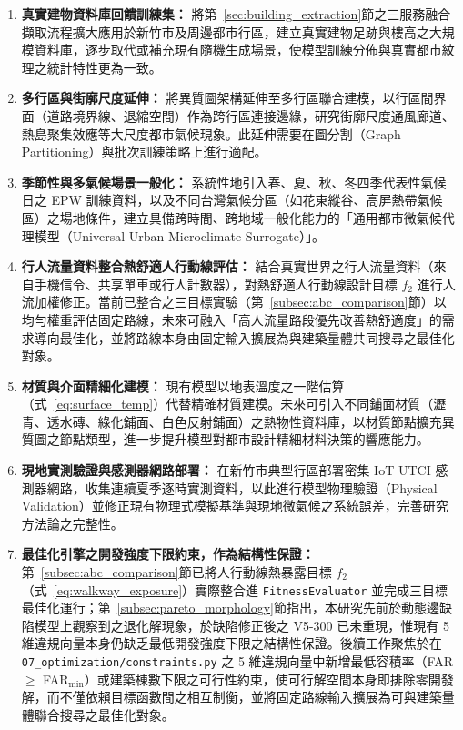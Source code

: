 \begin{enumerate}
    \item \textbf{真實建物資料庫回饋訓練集：}
    將第~\ref{sec:building_extraction}節之三服務融合擷取流程擴大應用於新竹市及周邊都市行區，建立真實建物足跡與樓高之大規模資料庫，逐步取代或補充現有隨機生成場景，使模型訓練分佈與真實都市紋理之統計特性更為一致。

    \item \textbf{多行區與街廓尺度延伸：}
    將異質圖架構延伸至多行區聯合建模，以行區間界面（道路境界線、退縮空間）作為跨行區連接邊緣，研究街廓尺度通風廊道、熱島聚集效應等大尺度都市氣候現象。此延伸需要在圖分割（Graph Partitioning）與批次訓練策略上進行適配。

    \item \textbf{季節性與多氣候場景一般化：}
    系統性地引入春、夏、秋、冬四季代表性氣候日之 EPW 訓練資料，以及不同台灣氣候分區（如花東縱谷、高屏熱帶氣候區）之場地條件，建立具備跨時間、跨地域一般化能力的「通用都市微氣候代理模型（Universal Urban Microclimate Surrogate）」。

    \item \textbf{行人流量資料整合熱舒適人行動線評估：}
    結合真實世界之行人流量資料（來自手機信令、共享單車或行人計數器），對熱舒適人行動線設計目標 $f_2$ 進行人流加權修正。當前已整合之三目標實驗（第~\ref{subsec:abc_comparison}節）以均勻權重評估固定路線，未來可融入「高人流量路段優先改善熱舒適度」的需求導向最佳化，並將路線本身由固定輸入擴展為與建築量體共同搜尋之最佳化對象。

    \item \textbf{材質與介面精細化建模：}
    現有模型以地表溫度之一階估算（式~\eqref{eq:surface_temp}）代替精確材質建模。未來可引入不同鋪面材質（瀝青、透水磚、綠化鋪面、白色反射鋪面）之熱物性資料庫，以材質節點擴充異質圖之節點類型，進一步提升模型對都市設計精細材料決策的響應能力。

    \item \textbf{現地實測驗證與感測器網路部署：}
    在新竹市典型行區部署密集 IoT UTCI 感測器網路，收集連續夏季逐時實測資料，以此進行模型物理驗證（Physical Validation）並修正現有物理式模擬基準與現地微氣候之系統誤差，完善研究方法論之完整性。

    \item \textbf{最佳化引擎之開發強度下限約束，作為結構性保證：}
    第~\ref{subsec:abc_comparison}節已將人行動線熱暴露目標 $f_2$（式~\eqref{eq:walkway_exposure}）實際整合進 \texttt{FitnessEvaluator} 並完成三目標最佳化運行；第~\ref{subsec:pareto_morphology}節指出，本研究先前於動態邊缺陷模型上觀察到之退化解現象，於缺陷修正後之 V5-300 已未重現，惟現有 5 維違規向量本身仍缺乏最低開發強度下限之結構性保證。後續工作聚焦於在 \texttt{07\_optimization/constraints.py} 之 5 維違規向量中新增最低容積率（FAR $\ge$ FAR$_{\min}$）或建築棟數下限之可行性約束，使可行解空間本身即排除零開發解，而不僅依賴目標函數間之相互制衡，並將固定路線輸入擴展為可與建築量體聯合搜尋之最佳化對象。
\end{enumerate}


